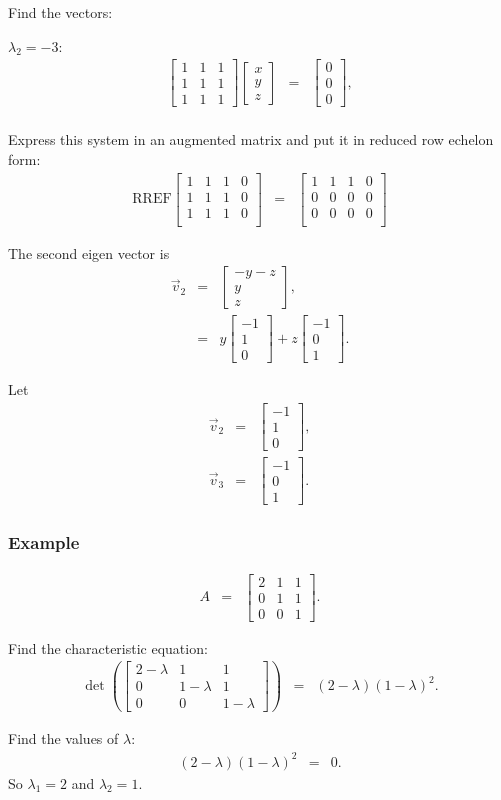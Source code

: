 \documentclass{beamer}
\newcommand{\lp}{\left(}
\newcommand{\rp}{\right)}
\newcommand{\vecThree}[3]{
  \left[
  \begin{array}{r}
    #1 \\  #2 \\ #3
  \end{array}
  \right]
}
\newcommand{\arrayThree}[9]{
  \left[
    \begin{array}{rrr}
      #1 & #2 & #3 \\
      #4 & #5 & #6 \\
      #7 & #8 & #9
    \end{array}
  \right]
}
\newcommand{\startRowFour}{
  \left[
    \begin{array}{rrr|r}
}
\newcommand{\oneRowFour}[4] {
      #1 & #2 & #3 & #4 \\
}
\newcommand{\stopRowOps}{
    \end{array}
  \right]
}
\begin{document}
\begin{frame}
  Find the vectors:

  $\lambda_2 = -3$:
  \begin{eqnarray*}
    \arrayThree{1}{1}{1}{1}{1}{1}{1}{1}{1}
    \vecThree{x}{y}{z} & = & \vecThree{0}{0}{0}, \\
  \end{eqnarray*}

  Express this system in an augmented matrix and put it in reduced row
  echelon form:
  \begin{eqnarray*}
    \mathrm{RREF}\startRowFour
    \oneRowFour{1}{1}{1}{0} 
    \oneRowFour{1}{1}{1}{0}
    \oneRowFour{1}{1}{1}{0}
    \stopRowOps
    & = & 
    \startRowFour
    \oneRowFour{1}{1}{1}{0} 
    \oneRowFour{0}{0}{0}{0}
    \oneRowFour{0}{0}{0}{0}
    \stopRowOps
  \end{eqnarray*}

\end{frame}

\begin{frame}

  The second eigen vector is 
  \begin{eqnarray*}
    \vec{v}_2 & = & \vecThree{-y-z}{y}{z}, \\
    & = & y \vecThree{-1}{1}{0} + z \vecThree{-1}{0}{1}.
  \end{eqnarray*}

  Let
  \begin{eqnarray*}
    \vec{v}_2 & = & \vecThree{-1}{1}{0}, \\
    \vec{v}_3 & = & \vecThree{-1}{0}{1}.
  \end{eqnarray*}

\end{frame}



\begin{frame}
  \frametitle{Example}

  \begin{eqnarray*}
    A & = & \arrayThree{2}{1}{1}{0}{1}{1}{0}{0}{1}.
  \end{eqnarray*}

  Find the characteristic equation:
  \begin{eqnarray*}
    \det\lp\arrayThree{2-\lambda}{1}{1}{0}{1-\lambda}{1}{0}{0}{1-\lambda}\rp
    & = & (2-\lambda) (1-\lambda)^2.
  \end{eqnarray*}

  Find the values of $\lambda$:
  \begin{eqnarray*}
    (2-\lambda) (1-\lambda)^2 & = & 0.
  \end{eqnarray*}
  So $\lambda_1 = 2$ and $\lambda_2=1$.


\end{frame}
\end{document}

